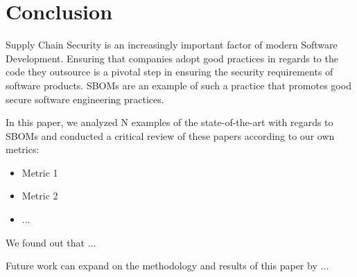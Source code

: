 \section{Conclusion}

Supply Chain Security is an increasingly important factor of modern Software Development. Ensuring that companies adopt good practices in regards to the code they outsource is a pivotal step in ensuring the security requirements of software products. SBOMs \cite{article:concept:sbom-2} are an example of such a practice that promotes good secure software engineering practices.

In this paper, we analyzed N examples of the state-of-the-art with regards to SBOMs and conducted a critical review of these papers according to our own metrics:
\begin{itemize}
    \item Metric 1
    \item Metric 2
    \item ...
\end{itemize}

We found out that ...

Future work can expand on the methodology and results of this paper by ...